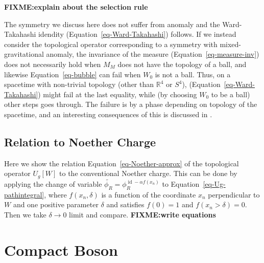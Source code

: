 \documentclass[
  letterpaper,
  DIV=11,
  numbers=noendperiod]{scrreport}
\DeclareMathOperator{\id}{id}
\begin{document}
\textbf{FIXME:explain about the selection rule}

\begin{tcolorbox}[enhanced jigsaw, bottomtitle=1mm, colback=white, toprule=.15mm, coltitle=black, opacityback=0, toptitle=1mm, arc=.35mm, left=2mm, title=\textcolor{quarto-callout-tip-color}{\faLightbulb}\hspace{0.5em}{\textsf{Mixed-gravitational anomaly}}, rightrule=.15mm, titlerule=0mm, leftrule=.75mm, colbacktitle=quarto-callout-tip-color!10!white, opacitybacktitle=0.6, breakable, bottomrule=.15mm, colframe=quarto-callout-tip-color-frame]

The symmetry we discuss here does not suffer from anomaly and the
Ward-Takahashi idendity (Equation~\ref{eq-Ward-Takahashi}) follows. If
we instead consider the topological operator corresponding to a symmetry
with mixed-gravitational anomaly, the invariance of the measure
(Equation~\ref{eq-measure-inv}) does not necessarily hold when \(M_M\)
does not have the topology of a ball, and likewise
Equation~\ref{eq-bubble} can fail when \(W_0\) is not a ball. Thus, on a
spacetime with non-trivial topology (other than \(\mathbb{R}^4\) or
\(S^4\)), (Equation~\ref{eq-Ward-Takahashi}) might fail at the last
equality, while (by choosing \(W_0\) to be a ball) other steps goes
through. The failure is by a phase depending on topology of the
spacetime, and an interesting consequences of this is discussed in
\autocite{Cordova:2019jqi}.

\end{tcolorbox}

\hypertarget{relation-to-noether-charge}{%
\section{Relation to Noether Charge}\label{relation-to-noether-charge}}

Here we show the relation Equation~\ref{eq-Noether-approx} of the
topological operator \(U_g[W]\) to the conventional Noether charge. This
can be done by applying the change of variable
\(\widetilde{\phi_R} = \phi^{\id - \alpha f(x_n)}_R\) to
Equation~\ref{eq-Ug-pathintegral}, where \(f(x_n,\delta)\) is a function
of the coordinate \(x_n\) perpendicular to \(W\) and one positive
parameter \(\delta\) and satisfies \(f(0) = 1\) and
\(f(x_n>\delta) =0\). Then we take \(\delta\to 0\) limit and compare.
\textbf{FIXME:write equations}


\hypertarget{sec-compact-boson}{%
\chapter{Compact Boson}\label{sec-compact-boson}}
\end{document}
